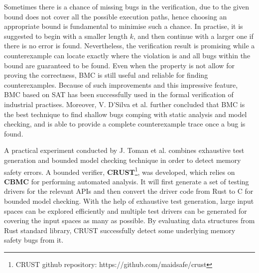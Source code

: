 Sometimes there is a chance of missing bugs in the verification, due to the given bound does not cover all the possible execution paths, hence choosing an appropriate bound is fundamental to minimise such a chance. In practise, it is suggested to begin with a smaller length $k$, and then continue with a larger one if there is no error is found. Nevertheless, the verification result is promising while a counterexample can locate exactly where the violation is and all bugs within the bound are guaranteed to be found. Even when the property is not allow for proving the correctness, BMC is still useful and reliable for finding counterexamples. Because of such improvements and this impressive feature, BMC based on SAT has been successfully used in the formal verification of industrial practises. Moreover, V. D'Silva et al. \cite{4544862} further concluded that BMC is the best technique to find shallow bugs comping with static analysis and model checking, and is able to provide a complete counterexample trace once a bug is found. 





A practical experiment conducted by J. Toman et al. \cite{7371997} combines exhaustive test generation and bounded model checking technique in order to detect memory safety errors. A bounded verifier, \textbf{CRUST}\footnote{CRUST github repository: https://github.com/maidsafe/crust}, was developed, which relies on \textbf{CBMC} for performing automated analysis. It will first generate a set of testing drivers for the relevant APIs and then convert the driver code from Rust to C for bounded model checking. With the help of exhaustive test generation, large input spaces can be explored efficiently and multiple test drivers can be generated for covering the input spaces as many as possible. By evaluating data structures from Rust standard library, CRUST successfully detect some underlying memory safety bugs from it.

